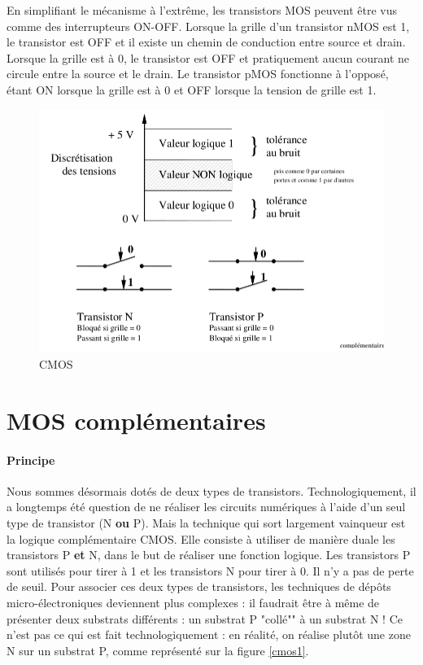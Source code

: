 En simplifiant le mécanisme à l'extrême, les transistors MOS peuvent être vus comme des interrupteurs ON-OFF.
Lorsque la grille d'un transistor nMOS est 1, le transistor est OFF et il existe un chemin de conduction entre source et drain.
Lorsque la grille est à 0, le transistor est OFF et pratiquement aucun courant ne circule entre la source et le drain.
Le transistor pMOS fonctionne à l'opposé, étant ON lorsque la grille est à 0 et OFF lorsque la tension de grille est 1.

\begin{figure}[htb]
\begin{center}
\includegraphics[scale=0.4]{figures/complementaire_1.png}
\caption{CMOS}
\end{center}
\end{figure}

\section{MOS complémentaires}

\paragraph{Principe}
Nous sommes désormais dotés de deux types de transistors. Technologiquement, il a longtemps été question de ne réaliser les circuits numériques à l'aide d'un seul type de transistor (N {\bf ou} P). Mais la technique qui sort largement vainqueur est la logique complémentaire CMOS. Elle consiste à utiliser de manière duale les transistors P {\bf et} N, dans le but de réaliser une fonction logique. Les transistors P sont utilisés pour tirer à 1 et les transistors N pour tirer à 0. Il n'y a pas de perte de seuil. Pour associer ces deux types de transistors, les techniques de dépôts micro-électroniques deviennent plus complexes : il faudrait être à même de
présenter deux substrats différents : un substrat P "collé"" à un substrat N ! Ce n'est pas ce qui est fait technologiquement : en réalité,
on réalise plutôt une zone N sur un substrat P, comme représenté sur la figure \ref{cmos1}.

